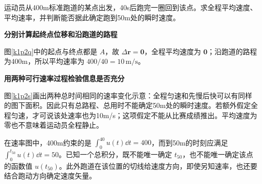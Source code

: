 \begin{question}\begin{example}[一圈赛跑的平均量]\label{k1p2}
运动员从400m标准跑道的某点出发，40s后跑完一圈回到该点。求全程平均速度、平均速率，并判断能否据此确定跑到50m处的瞬时速度。\end{example}
\end{question}
\begin{solution}\textbf{分别计算起终点位移和沿跑道的路程}\par\nobreak
图\ref{k1p2q}中的起点与终点都是 $A$，故 $\Delta\bm r=\bm0$，全程平均速度为 $\bm0$；沿跑道的路程为400m，所以平均速率为 $400/40=\boxed{10\,\mathrm{m/s}}$。



\par\medskip{}\noindent\textbf{用两种可行速率过程检验信息是否充分}\par\nobreak
图\ref{k1p2s}画出两种总时间相同的速率变化示意：全程匀速和先慢后快可以有同样的图下面积。因此只有总路程、总用时不能确定50m处的瞬时速度。若额外假定全程匀速，才可说该处速率也为10m/s；这项假定不能从比赛成绩推出。平均速度为零也不意味着运动员全程静止。

在速率图中，400m约束的是 $\int_0^{40}u(t)\dd t=400$，而到50m的时刻应满足 $\int_0^{t_{50}}u(t)\dd t=50$。已知一个总积分，既不能唯一确定 $t_{50}$，也不能唯一确定该点的函数值 $u(t_{50})$。此外跑道在该位置的切线给速度方向，即使另知速率，也还要结合跑动方向确定速度矢量。\end{solution}

